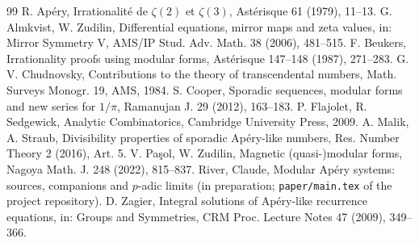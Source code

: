 \documentclass[11pt]{amsart}
\theoremstyle{definition}
\theoremstyle{remark}
\begin{document}
\begin{thebibliography}{99}
 R. Ap\'ery, Irrationalit\'e de $\zeta(2)$ et $\zeta(3)$, Ast\'erisque 61 (1979), 11--13.
 G. Almkvist, W. Zudilin, Differential equations, mirror maps and zeta values, in: Mirror Symmetry V, AMS/IP Stud. Adv. Math. 38 (2006), 481--515.
 F. Beukers, Irrationality proofs using modular forms, Ast\'erisque 147--148 (1987), 271--283.
 G. V. Chudnovsky, Contributions to the theory of transcendental numbers, Math. Surveys Monogr. 19, AMS, 1984.
 S. Cooper, Sporadic sequences, modular forms and new series for $1/\pi$, Ramanujan J. 29 (2012), 163--183.
 P. Flajolet, R. Sedgewick, Analytic Combinatorics, Cambridge University Press, 2009.
 A. Malik, A. Straub, Divisibility properties of sporadic Ap\'ery-like numbers, Res. Number Theory 2 (2016), Art. 5.
 V. Pa\c sol, W. Zudilin, Magnetic (quasi-)modular forms, Nagoya Math. J. 248 (2022), 815--837.
 River, Claude, Modular Ap\'ery systems: sources, companions and $p$-adic limits (in preparation; \texttt{paper/main.tex} of the project repository).
 D. Zagier, Integral solutions of Ap\'ery-like recurrence equations, in: Groups and Symmetries, CRM Proc. Lecture Notes 47 (2009), 349--366.
\end{thebibliography}
\end{document}
